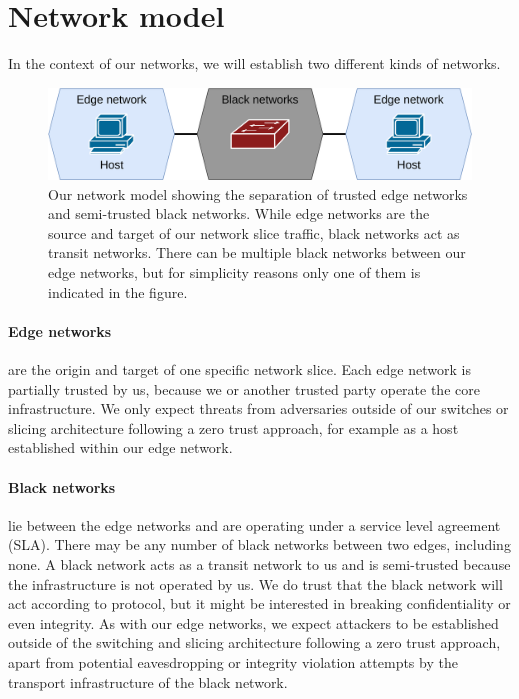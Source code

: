 \section{Network model}
In the context of our networks, we will establish two different kinds of networks.

\begin{figure}[ht]
  \centering
  \includegraphics[width=\textwidth]{images/chapter_4/network_model.png}
  \caption[Network model]{Our network model showing the separation of trusted edge networks and semi-trusted black networks. While edge networks are the source and target of our network slice traffic, black networks act as transit networks. There can be multiple black networks between our edge networks, but for simplicity reasons only one of them is indicated in the figure.}
  \label{fig:network_model}
\end{figure}

\paragraph{Edge networks}
are the origin and target of one specific network slice. Each edge network is partially trusted by us, because we or another trusted party operate the core infrastructure. We only expect threats from adversaries outside of our switches or slicing architecture following a zero trust approach, for example as a host established within our edge network.
\paragraph{Black networks}
lie between the edge networks and are operating under a service level agreement (SLA). There may be any number of black networks between two edges, including none. A black network acts as a transit network to us and is semi-trusted because the infrastructure is not operated by us. We do trust that the black network will act according to protocol, but it might be interested in breaking confidentiality or even integrity. As with our edge networks, we expect attackers to be established outside of the switching and slicing architecture following a zero trust approach, apart from potential eavesdropping or integrity violation attempts by the transport infrastructure of the black network.


